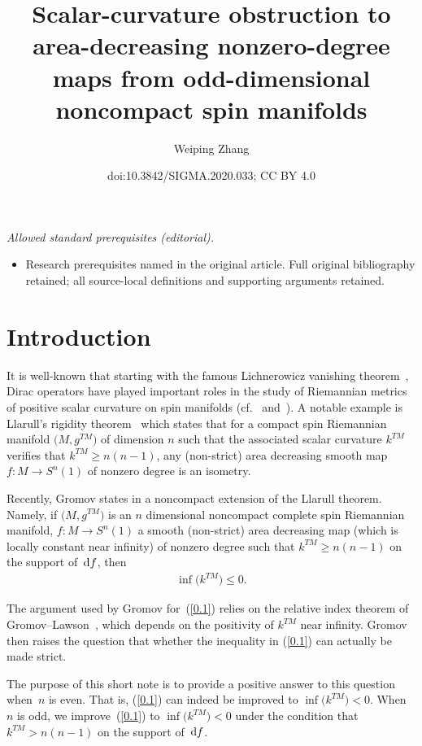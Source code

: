 \documentclass[10pt,a4paper]{amsart}
\title{Scalar-curvature obstruction to area-decreasing nonzero-degree maps from odd-dimensional noncompact spin manifolds}
\author{Weiping Zhang}
\date{doi:10.3842/SIGMA.2020.033; CC BY 4.0}
\numberwithin{equation}{section}
\theoremstyle{definition}
\begin{document}
\maketitle
\noindent\textit{Allowed standard prerequisites (editorial).}\begin{itemize}
\item Research prerequisites named in the original article. Full original bibliography retained; all source-local definitions and supporting arguments retained.
\end{itemize}\medskip
\section{Introduction} \label{s0}

It is well-known that starting with the famous Lichnerowicz vanishing theorem~\cite{L63}, Dirac operators have played important roles in the study of Riemannian metrics of positive scalar curvature on spin manifolds (cf.~\cite{GL83} and~\cite{LaMi89}). A notable example is Llarull's rigidity theorem~\cite{L98} which states that for a compact spin Riemannian manifold $\big(M,g^{TM}\big)$ of dimension $n$ such that the associated scalar curvature $k^{TM}$ verifies that $k^{TM}\geq n(n-1)$, any (non-strict) area decreasing smooth map $f\colon M\rightarrow S^n(1)$ of nonzero degree is an isometry.

Recently, Gromov states in \cite[p.~45]{Gr19} a noncompact extension of the Llarull theorem. Namely, if $\big(M,g^{TM}\big)$ is an $n$ dimensional noncompact complete spin Riemannian manifold, $f\colon M\rightarrow S^n(1)$ a smooth (non-strict) area decreasing map (which is locally constant near infinity) of nonzero degree such that $k^{TM}\geq n(n-1)$ on the support of~${\rm d}f$, then
\begin{gather}\label{0.1}
\inf \big(k^{TM}\big)\leq 0.
\end{gather}

The argument used by Gromov for~(\ref{0.1}) relies on the relative index theorem of Gromov--Lawson~\cite{GL83}, which depends on the positivity of $k^{TM}$ near infinity. Gromov then raises the question that whether the inequality in (\ref{0.1}) can actually be made {strict}.

The purpose of this short note is to provide a positive answer to this question when~$n$ is even. That is, (\ref{0.1}) can indeed be improved to $\inf \big(k^{TM}\big)< 0$. When $n$ is odd, we improve~(\ref{0.1}) to $\inf \big(k^{TM}\big)< 0$ under the condition that $k^{TM}> n(n-1)$ on the support of~${\rm d}f$.
\end{document}
